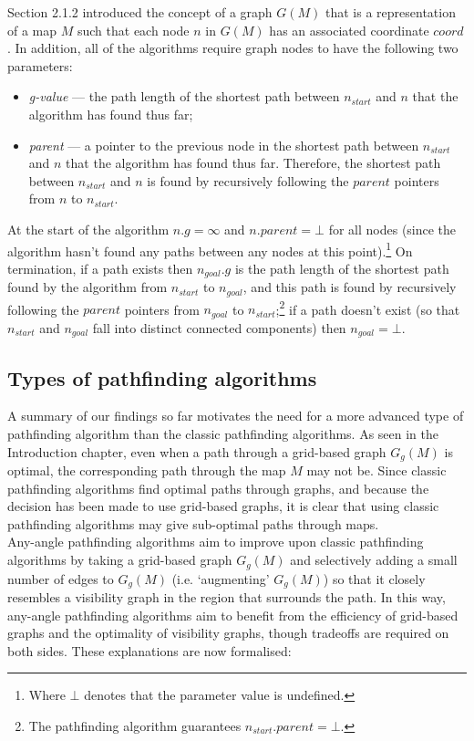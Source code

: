 \documentclass[12pt,notitlepage]{report}
\begin{document}
\noindent
Section 2.1.2 introduced the concept of a graph $G(M)$ that is a representation of a map $M$ such that each node $n$ in $G(M)$ has an associated coordinate $coord$. In addition, all of the algorithms require graph nodes to have the following two parameters:
\begin{itemize}
\item {\em g-value} --- the path length of the shortest path between $n_{start}$ and $n$ that the algorithm has found thus far;
\item {\em parent} --- a pointer to the previous node in the shortest path between $n_{start}$ and $n$ that the algorithm has found thus far. Therefore, the shortest path between $n_{start}$ and $n$ is found by recursively following the $parent$ pointers from $n$ to $n_{start}$.
\end{itemize}

\noindent
At the start of the algorithm $n.g = \infty$ and $n.parent = \bot$ for all nodes (since the algorithm hasn't found any paths between any nodes at this point).\footnote{Where $\bot$ denotes that the parameter value is undefined.} On termination, if a path exists then $n_{goal}.g$ is the path length of the shortest path found by the algorithm from $n_{start}$ to $n_{goal}$, and this path is found by recursively following the $parent$ pointers from $n_{goal}$ to $n_{start}$;\footnote{The pathfinding algorithm guarantees $n_{start}.parent = \bot$.} if a path doesn't exist (so that $n_{start}$ and $n_{goal}$ fall into distinct connected components) then $n_{goal} = \bot$.

\subsection {Types of pathfinding algorithms}

A summary of our findings so far motivates the need for a more advanced type of pathfinding algorithm than the classic pathfinding algorithms. As seen in the Introduction chapter, even when a path through a grid-based graph $G_{g}(M)$ is optimal, the corresponding path through the map $M$ may not be. Since classic pathfinding algorithms find optimal paths through graphs, and because the decision has been made to use grid-based graphs, it is clear that using classic pathfinding algorithms may give sub-optimal paths through maps.\\

\noindent
Any-angle pathfinding algorithms aim to improve upon classic pathfinding algorithms by taking a grid-based graph $G_{g}(M)$ and selectively adding a small number of edges to $G_{g}(M)$ (i.e. `augmenting' $G_{g}(M)$) so that it closely resembles a visibility graph in the region that surrounds the path. In this way, any-angle pathfinding algorithms aim to benefit from the efficiency of grid-based graphs and the optimality of visibility graphs, though tradeoffs are required on both sides. These explanations are now formalised:
\end{document}
